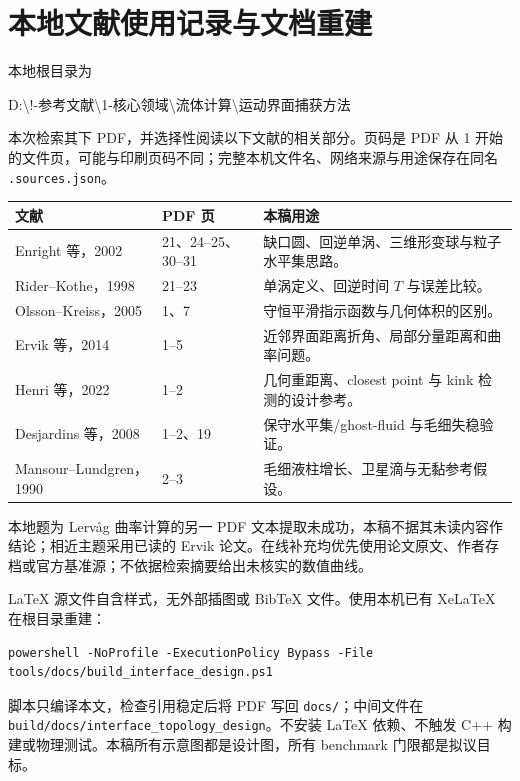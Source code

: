 \documentclass[11pt,a4paper]{article}
\newcommand{\code}[1]{{\small\nolinkurl{#1}}}
\begin{document}
\section{本地文献使用记录与文档重建}
本地根目录为\par
\noindent D:\textbackslash !-参考文献\textbackslash 1-核心领域\textbackslash 流体计算\textbackslash 运动界面捕获方法\par
本次检索其下 PDF，并选择性阅读以下文献的相关部分。页码是 PDF 从 1 开始的文件页，可能与印刷页码不同；完整本机文件名、网络来源与用途保存在同名 \code{.sources.json}。
\begin{longtable}{L{44mm}L{16mm}L{87mm}}
\toprule 文献 & PDF 页 & 本稿用途\\\midrule\endhead
Enright 等，2002 & 21、24--25、30--31 & 缺口圆、回逆单涡、三维形变球与粒子水平集思路。\\
Rider--Kothe，1998 & 21--23 & 单涡定义、回逆时间 $T$ 与误差比较。\\
Olsson--Kreiss，2005 & 1、7 & 守恒平滑指示函数与几何体积的区别。\\
Ervik 等，2014 & 1--5 & 近邻界面距离折角、局部分量距离和曲率问题。\\
Henri 等，2022 & 1--2 & 几何重距离、closest point 与 kink 检测的设计参考。\\
Desjardins 等，2008 & 1--2、19 & 保守水平集/ghost-fluid 与毛细失稳验证。\\
Mansour--Lundgren，1990 & 2--3 & 毛细液柱增长、卫星滴与无黏参考假设。\\\bottomrule
\end{longtable}
本地题为 Lervåg 曲率计算的另一 PDF 文本提取未成功，本稿不据其未读内容作结论；相近主题采用已读的 Ervik 论文。在线补充均优先使用论文原文、作者存档或官方基准源；不依据检索摘要给出未核实的数值曲线。

LaTeX 源文件自含样式，无外部插图或 BibTeX 文件。使用本机已有 XeLaTeX 在根目录重建：
\begin{lstlisting}
powershell -NoProfile -ExecutionPolicy Bypass -File tools/docs/build_interface_design.ps1
\end{lstlisting}
脚本只编译本文，检查引用稳定后将 PDF 写回 \code{docs/}；中间文件在 \code{build/docs/interface_topology_design}。不安装 LaTeX 依赖、不触发 C++ 构建或物理测试。本稿所有示意图都是设计图，所有 benchmark 门限都是拟议目标。
\end{document}
